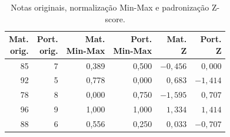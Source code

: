 \begin{table}[H]
    \centering
    \caption{Notas originais, normalização Min-Max e padronização Z-score.}
    \label{tab:q3-escalas}
    \footnotesize
    \setlength{\tabcolsep}{4pt}
    \begin{tabular}{@{}rrrrrr@{}}
        \toprule
        \shortstack{Mat.\\orig.} &
        \shortstack{Port.\\orig.} &
        \shortstack{Mat.\\Min-Max} &
        \shortstack{Port.\\Min-Max} &
        \shortstack{Mat.\\Z} &
        \shortstack{Port.\\Z} \\
        \midrule
        85 & 7 & 0,389 & 0,500 & $-0{,}456$ & $0{,}000$ \\
        92 & 5 & 0,778 & 0,000 & $0{,}683$ & $-1{,}414$ \\
        78 & 8 & 0,000 & 0,750 & $-1{,}595$ & $0{,}707$ \\
        96 & 9 & 1,000 & 1,000 & $1{,}334$ & $1{,}414$ \\
        88 & 6 & 0,556 & 0,250 & $0{,}033$ & $-0{,}707$ \\
        \bottomrule
    \end{tabular}
\end{table}
